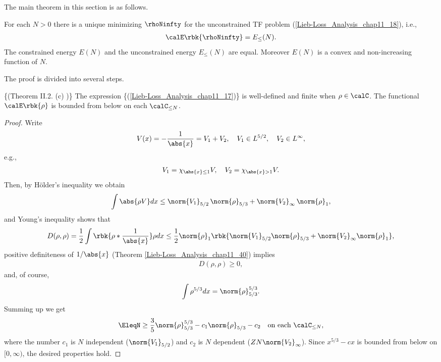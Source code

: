 \documentclass[openany, a4paper, oneside]{jsbook}
\begin{document}
The main theorem in this section is as follows.
\begin{thm}\label{Lieb-Loss_Analysis_chap11_33}
 For each $N > 0$ there is a unique minimizing $\rhoNinfty$ for the unconstrained TF problem (\ref{Lieb-Loss_Analysis_chap11_18}), i.e.,
\begin{align}
 \calE \rbk{\rhoNinfty}
 =
 E_{\leq} (N).
\end{align}
The constrained energy $E (N)$ and the unconstrained energy $E_{\leq} (N)$ are equal.
Moreover $E (N)$ is a convex and non-increasing function of $N$.
\end{thm}
The proof is divided into several steps.
\begin{lem}\textup\{(Theorem II.2. (c) \cite{LiebSimon1})\}\label{Lieb-Loss_Analysis_chap11_19}
 The expression \textup\{(\ref{Lieb-Loss_Analysis_chap11_17})\} is well-defined and finite when $\rho \in \calC$.
 The functional $\calE \rbk{\rho}$ is bounded from below on each $\calC_{\leq N}$.
\end{lem}
\begin{proof}
Write
\begin{align}
 V (x)
 =
 -\frac{1}{\abs{x}}
 =
 V_1 + V_2, \quad V_1 \in L^{5/2}, \quad V_2 \in L^{\infty},
\end{align}
e.g.,
\begin{align}
 V_1 = \chi_{\abs{x} \leq 1} V, \quad
 V_2 = \chi_{\abs{x} > 1} V.
\end{align}
Then, by H\"older's inequality we obtain
\begin{align}
 \int \abs{\rho V} dx
 \leq
 \norm{V_1}_{5/2} \, \norm{\rho}_{5/3} + \norm{V_2}_{\infty} \, \norm{\rho}_1,
\end{align}
and Young's inequality shows that
\begin{align}
 D (\rho, \rho)
 =
 \frac{1}{2} \int \rbk{\rho * \frac{1}{\abs{x}}} \rho dx
 \leq
 \frac{1}{2} \norm{\rho}_1 \rbk{\norm{V_1}_{5/2} \norm{\rho}_{5/3} + \norm{V_2}_{\infty} \norm{\rho}_1},
\end{align}
positive definiteness of $1/\abs{x}$ (Theorem \ref{Lieb-Loss_Analysis_chap11_40}) implies
\begin{align}
 D (\rho, \rho)
 \geq 0,
\end{align}
and, of course,
\begin{align}
 \int \rho^{5/3} dx
 =
 \norm{\rho}_{5/3}^{5/3}.
\end{align}
Summing up we get
\begin{align}
 \EleqN
 \geq
 \frac{3}{5} \norm{\rho}_{5/3}^{5/3} - c_1 \norm{\rho}_{5/3} - c_2 \quad \text{on each } \calC_{\leq N}, \label{Lieb-Loss_Analysis_chap11_21}
\end{align}
where the number $c_1$ is $N$ independent ($\norm{V_1}_{5/2}$) and $c_2$ is $N$ dependent ($ZN \norm{V_2}_{\infty}$).
Since $x^{5/3} - c x$ is bounded from below on $[0, \infty)$, the desired properties hold.
\end{proof}
\end{document}
